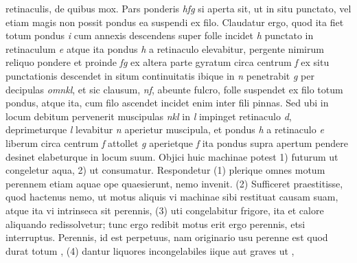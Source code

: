 retinaculis, de quibus mox. Pars ponderis \textit{hfg} si aperta sit, ut in situ punctato, vel etiam magis non possit pondus ea suspendi ex filo. Claudatur ergo, quod ita fiet totum pondus \textit{i} cum annexis descendens super folle incidet \textit{h} punctato in retinaculum \textit{e} atque ita pondus \textit{h} a retinaculo elevabitur, pergente nimirum reliquo pondere et proinde \textit{fg} ex altera parte gyratum circa centrum \textit{f} ex situ punctationis descendet in situm continuitatis ibique in \textit{n} penetrabit \textit{g} per decipulas \textit{omnkl}, et sic clausum, \textit{nf}, abeunte fulcro, folle suspendet ex filo totum pondus, atque ita, cum filo ascendet incidet enim inter fili pinnas. Sed ubi in locum debitum pervenerit muscipulas \textit{nkl} in \textit{l} impinget retinaculo \textit{d}, deprimeturque \textit{l} levabitur \textit{n} aperietur muscipula, et pondus \textit{h} a retinaculo \textit{e} liberum circa centrum \textit{f} attollet \textit{g} aperietque \textit{f} ita pondus supra apertum pendere desinet elabeturque in locum suum. Objici huic machinae potest 1) futurum ut congeletur aqua, 2) ut consumatur. Respondetur (1) plerique omnes motum perennem etiam aquae ope quaesierunt, nemo invenit. (2) Sufficeret praestitisse, quod hactenus nemo, ut motus aliquis vi machinae sibi restituat causam suam, atque ita vi intrinseca\protect{} sit perennis, (3) uti congelabitur frigore, ita et calore aliquando redissolvetur; tunc ergo redibit motus erit ergo perennis, etsi interruptus. Perennis, id est perpetuus, nam originario usu perenne est quod durat  totum , (4) dantur liquores incongelabiles iique aut graves ut \mercury, 

